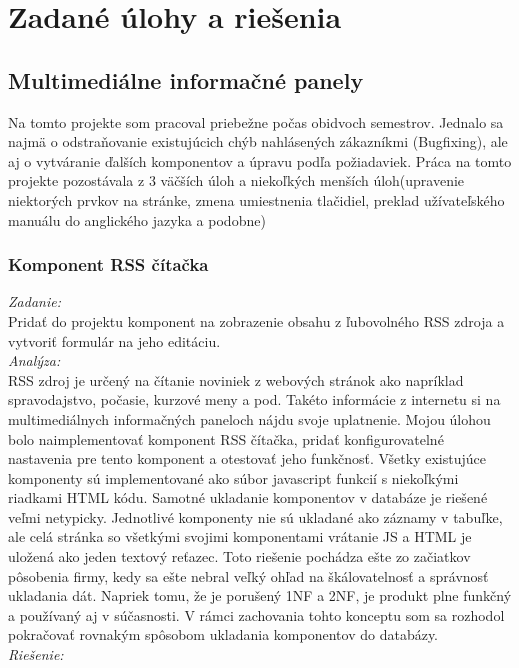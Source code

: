 \documentclass[11pt, oneside]{report}
\begin{document}
\chapter{Zadané úlohy a riešenia}
\section{Multimediálne informačné panely}
Na tomto projekte som pracoval  priebežne počas  obidvoch semestrov. Jednalo sa najmä o  odstraňovanie existujúcich chýb nahlásených zákazníkmi (Bugfixing), ale aj o vytváranie ďalších komponentov a úpravu podľa požiadaviek. Práca na tomto projekte pozostávala z 3 väčších úloh  a  niekoľkých menších úloh(upravenie niektorých prvkov na stránke, zmena umiestnenia tlačidiel, preklad užívateľského manuálu do anglického jazyka a podobne)
\subsection{Komponent RSS čítačka}
\textit{Zadanie:}\\
Pridať do projektu  komponent na zobrazenie obsahu z ľubovolného RSS zdroja a vytvoriť formulár na jeho editáciu.
\\\textit{Analýza:}\\
 RSS zdroj   je určený na čítanie noviniek  z webových stránok ako napríklad spravodajstvo, počasie, kurzové meny a pod. Takéto informácie  z internetu si na multimediálnych informačných paneloch nájdu svoje uplatnenie. Mojou úlohou bolo naimplementovať komponent RSS čítačka, pridať  konfigurovatelné nastavenia pre tento komponent a otestovať jeho funkčnosť.
Všetky existujúce komponenty sú implementované ako súbor javascript funkcií s niekoľkými riadkami HTML kódu. Samotné ukladanie komponentov v databáze je riešené veľmi netypicky. Jednotlivé komponenty nie sú ukladané ako záznamy v tabuľke, ale celá stránka  so všetkými svojimi komponentami vrátanie JS a HTML je uložená ako jeden textový reťazec. Toto riešenie  pochádza ešte zo začiatkov pôsobenia firmy, kedy sa ešte nebral veľký ohľad na  škálovatelnosť a  správnosť ukladania dát. 
Napriek tomu, že je porušený 1NF a 2NF, je produkt plne funkčný a používaný aj v súčasnosti. V rámci zachovania tohto konceptu som sa rozhodol pokračovať rovnakým spôsobom ukladania komponentov do databázy.
\\\textit{Riešenie:}\\
\end{document}
